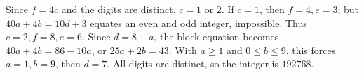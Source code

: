 Since $f=4c$ and the digits are distinct, $c=1$ or $2$. If $c=1$, then $f=4,e=3$; but $40a+4b=10d+3$ equates an even and odd integer, impossible. Thus $c=2,f=8,e=6$. Since $d=8-a$, the block equation becomes $40a+4b=86-10a$, or $25a+2b=43$. With $a\ge1$ and $0\le b\le9$, this forces $a=1,b=9$, then $d=7$. All digits are distinct, so the integer is $\boxed{192768}$.
